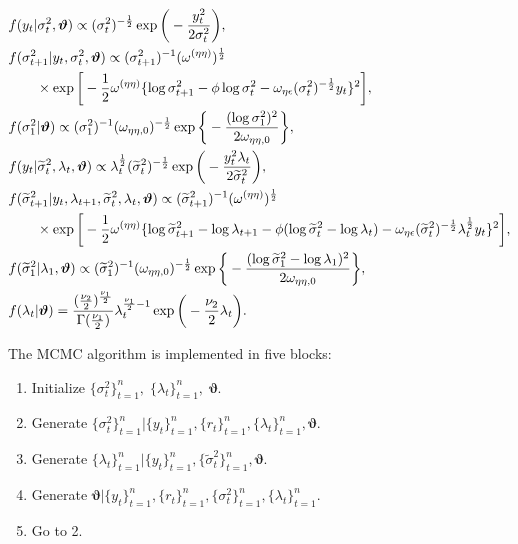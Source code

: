 \documentclass[11pt]{article}
\begin{document}
\begin{align}
&f(y_t |\sigma^2_{t}, \bm{\vartheta}) \propto (\sigma^2_t)^{-\frac{1}{2}} \exp\bigg(-\frac{y_t^2}{2\sigma^2_t} \bigg), \\
&f(\sigma^2_{t+1} |y_t, \sigma^2_{t}, \bm{\vartheta}) \propto (\sigma^2_{t+1})^{-1} (\omega^{(\eta\eta)})^{\frac{1}{2}} \notag \\
&\hspace{20pt} \times \exp\bigg[ -\frac{1}{2} \omega^{(\eta\eta)}
\{\log\sigma^2_{t+1} -\phi\log\sigma^2_t -\omega_{\eta\epsilon}(\sigma^2_t)^{-\frac{1}{2}} y_t \}^2
\bigg], \\
&f(\sigma^2_1 |\bm{\vartheta}) \propto (\sigma^2_1)^{-1} ( \omega_{\eta\eta, 0})^{-\frac{1}{2}} 
 \exp\bigg\{ -\frac{(\log\sigma^2_1 )^2}{2\omega_{\eta\eta, 0}} \bigg\}, \\
&f(y_t |\widetilde{\sigma}^2_{t}, \lambda_t, \bm{\vartheta}) \propto \lambda_t^{\frac{1}{2}} (\widetilde{\sigma}^2_t)^{-\frac{1}{2}} \exp\bigg(-\frac{y_t^2\lambda_t}{2\widetilde{\sigma}^2_t} \bigg), \\
&f(\widetilde{\sigma}^2_{t+1} |y_t, \lambda_{t+1}, \widetilde{\sigma}^2_{t}, \lambda_t, \bm{\vartheta}) 
\propto (\widetilde{\sigma}^2_{t+1})^{-1} (\omega^{(\eta\eta)})^{\frac{1}{2}} \notag \\
&\hspace{20pt} \times\exp\bigg[ -\frac{1}{2} \omega^{(\eta\eta)}
\{\log\widetilde{\sigma}^2_{t+1} -\log\lambda_{t+1} -\phi(\log\widetilde{\sigma}^2_t -\log\lambda_t) -\omega_{\eta\epsilon}(\widetilde{\sigma}^2_t)^{-\frac{1}{2}} \lambda_t^{\frac{1}{2}} y_t \}^2
\bigg], \\
&f(\widetilde{\sigma}^2_1 |\lambda_1, \bm{\vartheta}) \propto (\widetilde{\sigma}^2_1)^{-1} ( \omega_{\eta\eta, 0})^{-\frac{1}{2}} 
 \exp\bigg\{ -\frac{(\log\widetilde{\sigma}^2_1 -\log\lambda_1)^2}{2\omega_{\eta\eta, 0}} \bigg\}, \\
&f(\lambda_t |\bm{\vartheta}) =
\frac{(\frac{\nu_2}{2})^{\frac{\nu_1}{2}}}{\Gamma(\frac{\nu_1}{2})} \lambda_t^{\frac{\nu_1}{2}-1} \exp\bigg( -\frac{\nu_2}{2} \lambda_t \bigg).  
\end{align}

The MCMC algorithm is implemented in five blocks: 
\begin{enumerate}
\item 
Initialize $\{\sigma^2_t\}_{t=1}^n, \; \{\lambda_t\}_{t=1}^n, \; \bm{\vartheta}$.
\item 
Generate $\{\sigma^2_t\}_{t=1}^n |\{y_t\}_{t=1}^n, \{r_t\}_{t=1}^n, \{\lambda_t\}_{t=1}^n, \bm{\vartheta}$.
\item 
Generate $\{\lambda_t\}_{t=1}^n |\{y_t\}_{t=1}^n, \{\widetilde{\sigma}^2_t\}_{t=1}^n, \bm{\vartheta}$.
\item 
Generate $\bm{\vartheta} |\{y_t\}_{t=1}^n, \{r_t\}_{t=1}^n, \{\sigma^2_t\}_{t=1}^n, \{\lambda_t\}_{t=1}^n$.
\item 
Go to 2.
\end{enumerate}
\end{document}
